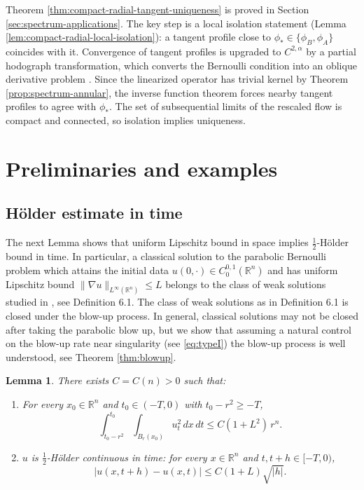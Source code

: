 \documentclass[11pt]{article}
\numberwithin{equation}{section}
\newtheorem{lemma}[theorem]{Lemma}
\theoremstyle{definition}
\newcommand{\RR}{\mathbb{R}}
\begin{document}
Theorem \ref{thm:compact-radial-tangent-uniqueness} is proved in Section \ref{sec:spectrum-applications}. The key step is a local isolation statement (Lemma \ref{lem:compact-radial-local-isolation}): a tangent profile close to $\phi_*\in\{\phi_B,\phi_A\}$ coincides with it. Convergence of tangent profiles is upgraded to $C^{2,\alpha}$ by a partial hodograph transformation, which converts the Bernoulli condition into an oblique derivative problem \cite{LT}. Since the linearized operator has trivial kernel by Theorem \ref{prop:spectrum-annular}, the inverse function theorem forces nearby tangent profiles to agree with $\phi_*$. The set of subsequential limits of the rescaled flow is compact and connected, so isolation implies uniqueness.


\section{Preliminaries and examples}\label{sec:prelim}


\subsection{H\"{o}lder estimate in time}


The next Lemma shows that uniform Lipschitz bound in space implies $\frac12$-H\"older bound in time. In particular, a classical solution to the parabolic Bernoulli problem which attains the initial data $u(0,\cdot) \in C_0^{0,1}(\RR^n)$ and has uniform Lipschitz bound $\|\nabla u\|_{L^\infty(\RR^n)} \leq L$ belongs to the class of weak solutions studied in \cite{Weiss}, see Definition 6.1. 
The class of weak solutions as in Definition 6.1 is closed under the blow-up process. In general, classical solutions may not be closed after taking the parabolic blow up, but we show that assuming a natural control on the blow-up rate near singularity (see \eqref{eq:typeI}) the blow-up process is well understood, see Theorem \ref{thm:blowup}. 

\begin{lemma}\label{lem:holder}  
There exists $C=C(n)>0$ such that:
\begin{enumerate}[label=\textup{(\roman*)}]
\item For every $x_0\in\RR^n$ and $t_0\in(-T,0)$ with $t_0-r^2\geq -T$,
\begin{equation*}
\int_{t_0-r^2}^{t_0}\int_{B_r(x_0)} u_t^2\,dx\,dt\leq C(1+L^2)\,r^n.
\end{equation*}
\item $u$ is $\frac12$-H\"older continuous in time: for every $x\in\RR^n$ and $t,t+h\in[-T,0)$,
\begin{equation}\label{eq:Holderintime}
    |u(x,t+h)-u(x,t)|\leq C(1+L)\sqrt{|h|}.
\end{equation}
\end{enumerate}
\end{lemma}
\end{document}
